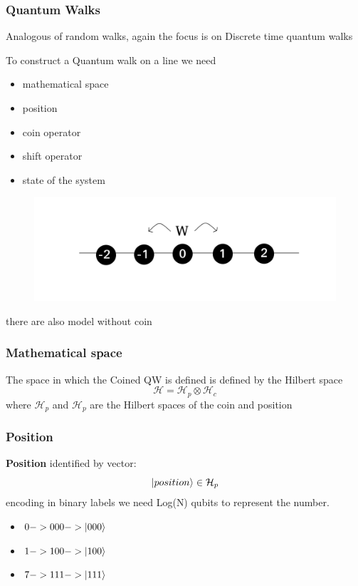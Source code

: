 \documentclass{beamer}
\begin{document}
\begin{frame}
    \frametitle{Quantum Walks}
    Analogous of random walks, again the focus is on Discrete time quantum walks

    \begin{example}
        To construct a Quantum walk on a line we need
        \begin{itemize}
            \item mathematical space
            \item position
            \item coin operator
            \item shift operator
            \item state of the system
        \end{itemize}
    \end{example}

    \begin{figure}[h!]
        \includegraphics[scale=0.2]{img/random_walk_line.png}
        \centering
    \end{figure}
    there are also model without coin
\end{frame}


\begin{frame}
    \frametitle{Mathematical space}
    The space in which the Coined QW is defined is defined by the Hilbert space
    \begin{equation}
        \mathcal{H}=\mathcal{H}_{p}\otimes\mathcal{H}_{c}
    \end{equation}
    where $\mathcal{H}_{p}$ and $\mathcal{H}_{p}$ are the Hilbert spaces 
    of the coin and position  
\end{frame}

\begin{frame}
    \frametitle{Position}
    \textbf{Position} identified by vector:
    \begin{equation}
        \ket{position} \in \mathcal{H}_{p}
    \end{equation} 
    encoding in binary labels we need Log(N) qubits to represent the number.

    \begin{example}[$N < 8 => 3 qubits$]
        \begin{itemize}
            \item $0 -> 000 -> \ket{000}$
            \item $1 -> 100 -> \ket{100}$
            \item $7 -> 111 -> \ket{111}$
        \end{itemize}
    \end{example}    
\end{frame}
\end{document}
